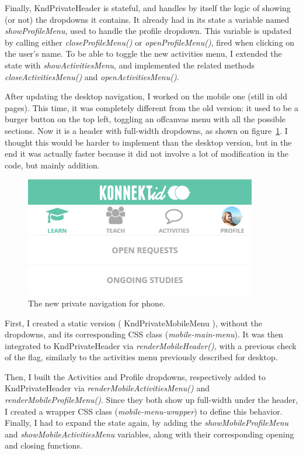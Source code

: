 Finally, KndPrivateHeader is stateful, and handles by itself the logic of showing (or not) the dropdowns it contains. It already had in its state a variable named \textit{showProfileMenu}, used to handle the profile dropdown. This variable is updated by calling either \textit{closeProfileMenu()} or \textit{openProfileMenu()}, fired when clicking on the user's name. To be able to toggle the new activities menu, I extended the state with \textit{showActivitiesMenu}, and implemented the related methods \textit{closeActivitiesMenu()} and \textit{openActivitiesMenu()}.

After updating the desktop navigation, I worked on the mobile one (still in old pages). This time, it was completely different from the old version: it used to be a burger button on the top left, toggling an offcanvas menu with all the possible sections. Now it is a header with full-width dropdowns, as shown on {\sc figure}~\ref{fig:newNavPhone}. I thought this would be harder to implement than the desktop version, but in the end it was actually faster because it did not involve a lot of modification in the code, but mainly addition.

\begin{figure}[H]
    \centering
    \includegraphics{figure/newNavPhone.png}
    \caption{The new private navigation for phone.}
    \label{fig:newNavPhone}
\end{figure}

First, I created a static version (\guillemotleft{} KndPrivateMobileMenu \guillemotright{}), without the dropdowns, and its corresponding CSS class (\textit{mobile-main-menu}). It was then integrated to \guillemotleft{} KndPrivateHeader \guillemotright{} via \textit{renderMobileHeader()}, with a previous check of the flag, similarly to the activities menu previously described for desktop.

Then, I built the \guillemotleft{} Activities \guillemotright{} and \guillemotleft{} Profile \guillemotright{} dropdowns, respectively added to \guillemotleft{} KndPrivateHeader \guillemotright{} via \textit{renderMobileActivitiesMenu()} and \textit{renderMobileProfileMenu()}. Since they both show up full-width under the header, I created a wrapper CSS class (\textit{mobile-menu-wrapper}) to define this behavior. Finally, I had to expand the state again, by adding the \textit{showMobileProfileMenu} and \textit{showMobileActivitiesMenu} variables, along with their corresponding opening and closing functions.

